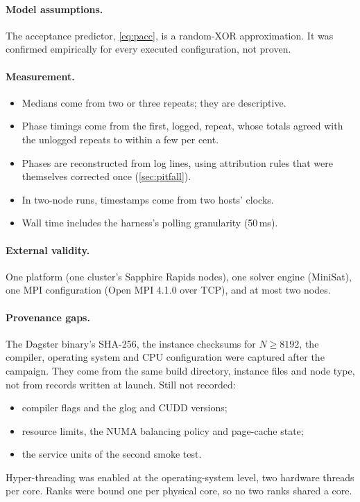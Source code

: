 \documentclass[11pt,a4paper]{article}
\begin{document}
\paragraph{Model assumptions.}
The acceptance predictor, \cref{eq:pacc}, is a random-XOR approximation. It was confirmed
empirically for every executed configuration, not proven.

\paragraph{Measurement.}
\begin{itemize}
\item Medians come from two or three repeats; they are descriptive.
\item Phase timings come from the first, logged, repeat, whose totals agreed with the
      unlogged repeats to within a few per cent.
\item Phases are reconstructed from log lines, using attribution rules that were themselves
      corrected once (\cref{sec:pitfall}).
\item In two-node runs, timestamps come from two hosts' clocks.
\item Wall time includes the harness's polling granularity (50\,ms).
\end{itemize}

\paragraph{External validity.}
One platform (one cluster's Sapphire Rapids nodes), one solver engine (MiniSat), one MPI
configuration (Open MPI 4.1.0 over TCP), and at most two nodes.

\paragraph{Provenance gaps.}
The Dagster binary's SHA-256, the instance checksums for $N\ge 8192$, the compiler,
operating system and CPU configuration were captured after the campaign. They come from the
same build directory, instance files and node type, not from records written at launch. Still
not recorded:
\begin{itemize}
\item compiler flags and the glog and CUDD versions;
\item resource limits, the NUMA balancing policy and page-cache state;
\item the service units of the second smoke test.
\end{itemize}
Hyper-threading was enabled at the operating-system level, two hardware threads per core.
Ranks were bound one per physical core, so no two ranks shared a core.
\end{document}
